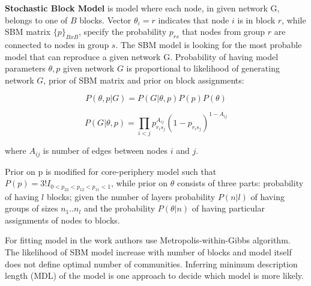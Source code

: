 \textbf{Stochastic Block Model} is model where each node, in given network G,  belongs to one of $B$ blocks. Vector $\theta_i = r$ indicates that node $i$ is in block $r$, while SBM matrix $\{p\}_{BxB}$, specify the probability $p_{rs}$ that nodes from group $r$ are connected to nodes in group $s$. The SBM model is looking for the most probable model that can reproduce a given network G. Probability of having model parameters $\theta, p$ given network $G$ is proportional to likelihood of generating network $G$, prior of SBM matrix and prior on block assignments:

\begin{equation}
P(\theta, p| G) = P(G | \theta , p) P(p) P(\theta) 
\end{equation}

\begin{equation}
P(G | \theta , p) = \prod_{i<j} p_{r_is_j}^{A_{ij}}(1-p_{r_is_j})^{1-A_{ij}}  
\end{equation}

where $A_{ij}$ is number of edges between nodes $i$ and $j$. 

Prior on p is modified for core-periphery model such that $P(p) = 3!I_{0<p_{22}<p_{12}<p_{11}<1}$, while prior on $\theta $ consists of three parts: probability of having $l$ blocks; given the number of layers probability $P(n|l)$ of having groups of sizes ${n_1..n_l}$ and the probability $P(\theta|n)$ of having particular assignments of nodes to blocks. 

For fitting model in the work \cite{gallagher2020clarified} authors use Metropolis-within-Gibbs algorithm.
The likelihood of SBM model increase with number of blocks and model itself does not define optimal number of communities. Inferring minimum description length (MDL)
of the model is one approach to decide which model is more likely.      


